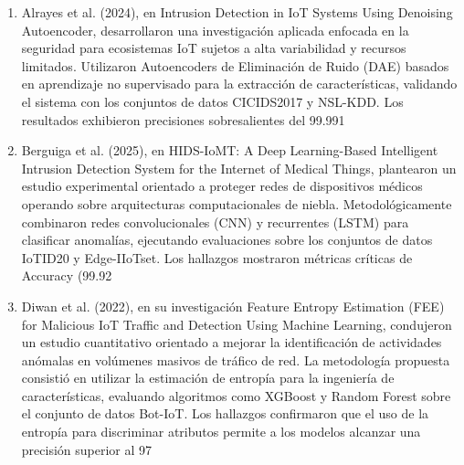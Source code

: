 \begin{enumerate}
\item Alrayes et al. (2024), en Intrusion Detection in IoT Systems Using Denoising Autoencoder, desarrollaron una investigación aplicada enfocada en la seguridad para ecosistemas IoT sujetos a alta variabilidad y recursos limitados. Utilizaron Autoencoders de Eliminación de Ruido (DAE) basados en aprendizaje no supervisado para la extracción de características, validando el sistema con los conjuntos de datos CICIDS2017 y NSL-KDD. Los resultados exhibieron precisiones sobresalientes del 99.991%

\item Berguiga et al. (2025), en HIDS-IoMT: A Deep Learning-Based Intelligent Intrusion Detection System for the Internet of Medical Things, plantearon un estudio experimental orientado a proteger redes de dispositivos médicos operando sobre arquitecturas computacionales de niebla. Metodológicamente combinaron redes convolucionales (CNN) y recurrentes (LSTM) para clasificar anomalías, ejecutando evaluaciones sobre los conjuntos de datos IoTID20 y Edge-IIoTset. Los hallazgos mostraron métricas críticas de Accuracy (99.92%

\item Diwan et al. (2022), en su investigación Feature Entropy Estimation (FEE) for Malicious IoT Traffic and Detection Using Machine Learning, condujeron un estudio cuantitativo orientado a mejorar la identificación de actividades anómalas en volúmenes masivos de tráfico de red. La metodología propuesta consistió en utilizar la estimación de entropía para la ingeniería de características, evaluando algoritmos como XGBoost y Random Forest sobre el conjunto de datos Bot-IoT. Los hallazgos confirmaron que el uso de la entropía para discriminar atributos permite a los modelos alcanzar una precisión superior al 97%


\end{enumerate}
